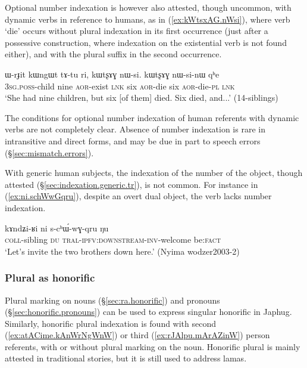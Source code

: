 Optional number indexation is however also attested, though uncommon, with dynamic verbs in reference to humans, as in (\ref{ex:kWtsxAG.nWsi}), where verb `die' occurs without plural indexation in its first occurrence (just after a possessive construction, where indexation on the existential verb  is not found either), and with the plural suffix  in the second occurrence.

\begin{exe}
\ex \label{ex:kWtsxAG.nWsi}
\gll ɯ-rɟit kɯngɯt tɤ-tu ri, kɯtʂɤɣ nɯ-si. kɯtʂɤɣ nɯ-si-nɯ qʰe \\
\textsc{3sg}.\textsc{poss}-child nine \textsc{aor}-exist \textsc{lnk} six \textsc{aor}-die six \textsc{aor}-die-\textsc{pl} \textsc{lnk} \\
\glt `She had nine children, but six [of them] died. Six died, and...' (14-siblings) 	
\end{exe}

The conditions for optional number indexation of human referents with dynamic verbs are not completely clear. Absence of number indexation is rare in intransitive and direct forms, and may be due in part to speech errors (§\ref{sec:mismatch.errors}).


With generic human subjects, the indexation of the number of the object, though attested (§\ref{sec:indexation.generic.tr}), is not common. For instance in (\ref{ex:ni.schWwGqru}), despite an overt dual object, the verb lacks number indexation.

\begin{exe}
\ex \label{ex:ni.schWwGqru}
\gll kɤndʑi-ʁi ni s-cʰɯ́-wɣ-qru ŋu \\
\textsc{coll}-sibling \textsc{du} \textsc{tral}-\textsc{ipfv}:\textsc{downstream}-\textsc{inv}-welcome be:\textsc{fact} \\
\glt `Let's invite the two brothers down here.' (Nyima wodzer2003-2)
\end{exe} 
 
 
\subsubsection{Plural as honorific} \label{sec:honorific.indexation}
  
Plural marking on nouns (§\ref{sec:ra.honorific}) and pronouns (§\ref{sec:honorific.pronouns}) can be used to express singular honorific in Japhug. Similarly, honorific plural indexation is found with second (\ref{ex:atACime.kAnWrNgWnW}) or third (\ref{ex:rJAlpu.mArAZinW}) person referents, with or without plural  marking on the noun. Honorific plural is mainly attested in traditional stories, but it is still used to address lamas.

